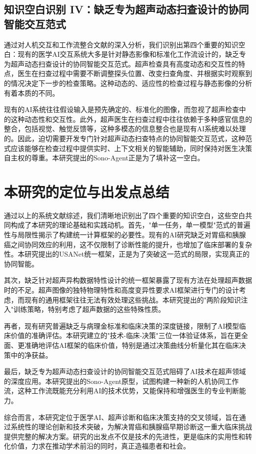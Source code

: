 \subsection{知识空白识别 IV：缺乏专为超声动态扫查设计的协同智能交互范式}

通过对人机交互和工作流整合文献的深入分析，我们识别出第四个重要的知识空白：现有的医学AI交互系统大多是针对静态影像和标准化工作流设计的，缺乏专为超声动态扫查设计的协同智能交互范式。超声检查具有高度动态和交互性的特点，医生在扫查过程中需要不断调整探头位置、改变扫查角度、并根据实时观察到的情况决定下一步的检查策略。这种动态的、适应性的检查过程与静态影像的分析有着本质的不同。

现有的AI系统往往假设输入是预先确定的、标准化的图像，而忽视了超声检查中的这种动态性和交互性。此外，超声医生在扫查过程中往往依赖于多种感官信息的整合，包括视觉、触觉反馈等，这种多模态的信息整合也是现有AI系统难以处理的。因此，迫切需要开发专门针对超声动态扫查特点的协同智能交互范式，这种范式应该能够在检查过程中提供实时、上下文相关的智能辅助，同时保持对医生决策自主权的尊重。本研究提出的Sono-Agent正是为了填补这一空白。

\section{本研究的定位与出发点总结}

通过以上的系统文献综述，我们清晰地识别出了四个重要的知识空白，这些空白共同构成了本研究的理论基础和实践动机。首先，"单一任务，单一模型"范式的普遍性与局限性揭示了构建统一计算框架的必要性。现有的AI研究缺乏对胃癌和胰腺癌之间协同效应的利用，这不仅限制了诊断性能的提升，也增加了临床部署的复杂性。本研究提出的USANet统一框架，正是为了突破这一范式的局限，实现真正的协同智能。

其次，缺乏针对超声异构数据特性设计的统一框架暴露了现有方法在处理超声数据时的不足。超声图像的独特物理特性和高度变异性要求AI框架进行专门的设计考虑，而现有的通用框架往往无法有效处理这些挑战。本研究提出的"两阶段知识注入"训练策略，特别考虑了超声数据的这些特殊性质。

再者，现有研究普遍缺乏与病理金标准和临床决策的深度链接，限制了AI模型临床价值的准确评估。本研究建立的"技术-临床-决策"三位一体验证体系，旨在更全面、更准确地评估AI框架的临床价值，特别是通过决策曲线分析量化其在临床决策中的净获益。

最后，缺乏专为超声动态扫查设计的协同智能交互范式阻碍了AI技术在超声领域的深度应用。本研究提出的Sono-Agent原型，试图构建一种新的人机协同工作流，这种工作流既能充分利用AI的技术优势，又能保持和增强医生的专业判断能力。

综合而言，本研究定位于医学AI、超声诊断和临床决策支持的交叉领域，旨在通过系统性的理论创新和技术突破，为解决胃癌和胰腺癌早期诊断这一重大临床挑战提供完整的解决方案。研究的出发点不仅是技术的先进性，更是临床的实用性和转化价值，力求在推动学术前沿的同时，真正造福患者和社会。

